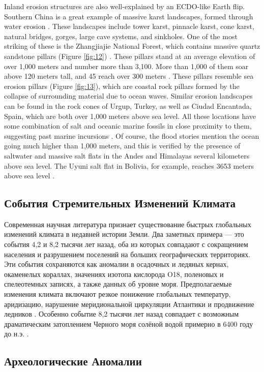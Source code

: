 \documentclass[10pt,twocolumn,letterpaper]{article}
\begin{document}
Inland erosion structures are also well-explained by an ECDO-like Earth flip. Southern China is a great example of massive karst landscapes, formed through water erosion \cite{82}. These landscapes include tower karst, pinnacle karst, cone karst, natural bridges, gorges, large cave systems, and sinkholes. One of the most striking of these is the Zhangjiajie National Forest, which contains massive quartz sandstone pillars (Figure \ref{fig:12}) \cite{84}. These pillars stand at an average elevation of over 1,000 meters and number more than 3,100. More than 1,000 of them soar above 120 meters tall, and 45 reach over 300 meters \cite{85}. These pillars resemble sea erosion pillars (Figure \ref{fig:13}), which are coastal rock pillars formed by the collapse of surrounding material due to ocean waves. Similar erosion landscapes can be found in the rock cones of Urgup, Turkey, as well as Ciudad Encantada, Spain, which are both over 1,000 meters above sea level. All these locations have some combination of salt and oceanic marine fossils in close proximity to them, suggesting past marine incursions \cite{15,86,87}. Of course, the flood stories \cite{3} mention the ocean going much higher than 1,000 meters, and this is verified by the presence of saltwater and massive salt flats in the Andes and Himalayas several kilometers above sea level. The Uyuni salt flat in Bolivia, for example, reaches 3653 meters above sea level \cite{94}.

\subsection{События Стремительных Изменений Климата}

Современная научная литература признает существование быстрых глобальных изменений климата в недавней истории Земли. Два заметных примера — это события 4,2 и 8,2 тысячи лет назад, оба из которых совпадают с сокращением населения и разрушением поселений на больших географических территориях. Эти события сохраняются как аномалии в осадочных и ледяных кернах, окаменелых кораллах, значениях изотопа кислорода O18, поленовых и спелеотемных записях, а также данных об уровне моря. Предполагаемые изменения климата включают резкое понижение глобальных температур, аридизацию, нарушение меридиональной циркуляции Атлантики и продвижение ледников \cite{90,91,92}. Особенно событие 8,2 тысячи лет назад совпадает с возможным драматическим затоплением Черного моря солёной водой примерно в 6400 году до н.э. \cite{93}.

\subsection{Археологические Аномалии}
\end{document}
